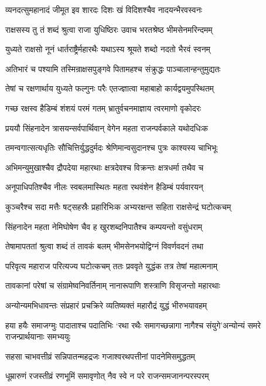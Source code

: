 \twolineshloka
{व्यनदत्सुमहानादं जीमूत इव शारदः}
{दिशः खं विदिशश्चैव नादयन्भैरवस्वनः}


\twolineshloka
{राक्षसस्य तु तं शब्दं श्रुत्वा राजा युधिष्ठिरः}
{उवाच भरतश्रेष्ठ भीमसेनमरिन्दमम्}


\twolineshloka
{युध्यते राक्षसो नूनं धार्तराष्ट्रैर्महारथैः}
{यथाऽस्य श्रूयते शब्दो नदतो भैरवं स्वनम्}


\twolineshloka
{अतिभारं च पश्यामि तस्मिन्राक्षसपुङ्गवे}
{पितामहश्च संक्रुद्धः पाञ्चालान्हन्तुमुद्यतः}


\twolineshloka
{तेषां च रक्षणार्थाय युध्यते फल्गुनः परैः}
{एतज्ज्ञात्वा महाबाहो कार्यद्वयमुपस्थितम्}


\twolineshloka
{गच्छ रक्षस्व हैडिम्बं शंशयं परमं गतम्}
{भ्रातुर्वचनमाज्ञाय त्वरमाणो वृकोदरः}


\twolineshloka
{प्रययौ सिंहनादेन त्रासयन्सर्वपार्थिवान्}
{वेगेन महता राजन्पर्वकाले यथोदधिःक}


\twolineshloka
{तमन्वगात्सत्यधृतिः सौचित्तिर्युद्धदुर्मदः}
{श्रेणिमान्वसुदानश्च पुत्रः काश्यस्य चाभिभूः}


\twolineshloka
{अभिमन्युमुखाश्चैव द्रौपदेया महारथाः}
{क्षत्रदेवश्च विक्रन्तः क्षत्रधर्मा तथैव च}


\twolineshloka
{अनूपाधिपतिश्चैव नीलः स्वबलमास्थितः}
{महता रथवंशेन हैडिम्बं पर्यवारयन्}


\twolineshloka
{कुञ्चरैश्च सदा मत्तैः षट्सहस्रैः प्रहारिभिःक}
{अभ्यरक्षन्त सहिता राक्षसेन्द्रं घटोत्कचम्}


\twolineshloka
{सिंहनादेन महता नेमिघोषेण चैव ह}
{खुरशब्दनिपातैश्च कम्पयन्तो वसुंधराम्}


\twolineshloka
{तेषामापततां श्रुत्वा शब्दं तं तावकं बलम्}
{भीमसेनभयोद्विग्नं विवर्णवदनं तथा}


\twolineshloka
{परिवृत्य महाराज परित्यज्य घटोत्कचम्}
{ततः प्रववृते युद्धंक तत्र तेषां महात्मनाम्}


\twolineshloka
{तावकानां परेषां च संग्रामेष्वनिवर्तिनाम्}
{नानारूपाणि शस्त्राणि विसृजन्तो महारथाः}


\twolineshloka
{अन्योन्यमभिधावन्तः संप्रहारं प्रचक्रिरे}
{व्यतिष्यक्तं महारौद्रं युद्धं भीरुभयावहम्}


\twolineshloka
{हया हयैः समाजग्मुः पादाताश्च पदातिभिः}
{`रथा रथैः समागच्छन्नागा नागैश्च संयुगे'अन्योन्यं समरे राजन्प्रार्थयानाः समभ्ययुः}


\twolineshloka
{सहसा चाभवत्तीव्रं सन्निपातन्महद्रजः}
{गजाश्वरथपत्तीनां पादनेमिसमुद्धतम्}


\twolineshloka
{धूम्रारुणं रजस्तीव्रं रणभूमिं समावृणोत्}
{नैव स्वे न परे राजन्समजानन्परस्परम्}


